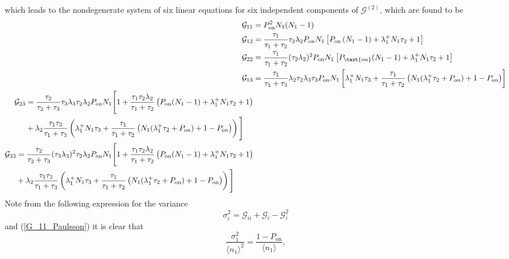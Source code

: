\documentclass[a4paper, 11pt]{article}
\begin{document}
which leads to the nondegenerate system of six linear equations for six independent components of $\boldsymbol{\mathcal G}^{(2)}$, which are found to be
\begin{align}
      {\mathcal G}_{11}& = P_{\text{on}}^2N_1(N_1-1) \label{G_11_Paulsson}\\
      {\mathcal G}_{12}& = \frac{\tau_1}{\tau_1+\tau_2}\tau_2\lambda_2P_{\text{on}}N_1\left[P_{\text{on}}\left(N_1-1\right)+\lambda_1^+N_1\tau_2+1\right]\\
      {\mathcal G}_{22}& = \frac{\tau_1}{\tau_1+\tau_2}(\tau_2\lambda_2)^2P_{\text{on}}N_1\left[P_{\taxt{on}}(N_1-1)+\lambda_1^+N_1\tau_2+1\right] \label{G_22_Paulsson} \\
      {\mathcal G}_{13}& = \frac{\tau_1}{\tau_1+\tau_3}\lambda_2\tau_2\lambda_3\tau_3P_{\text{on}}N_1\left[\lambda_1^+N_1\tau_3 + \frac{\tau_1}{\tau_1+\tau_2}\left(N_1(\lambda_1^+\tau_2+P_{\text{on}})+1-P_{\text{on}}\right)\right]\\
      \begin{split}
        {\mathcal G}_{23}& = \frac{\tau_2}{\tau_2+\tau_3}\tau_3\lambda_3\tau_2\lambda_2P_{\text{on}}N_1\Bigg[1 + \frac{\tau_1\tau_2\lambda_2}{\tau_1+\tau_2}\left(P_{\text{on}}(N_1-1)+\lambda_1^+N_1\tau_2+1\right)\\& + \lambda_2\frac{\tau_1\tau_3}{\tau_1+\tau_3}\left(\lambda_1^+N_1\tau_3 + \frac{\tau_1}{\tau_1+\tau_2}\left(N_1(\lambda_1^+\tau_2+P_{\text{on}})+1-P_{\text{on}}\right)\right)\Bigg]
      \end{split}\\
      \begin{split}
        {\mathcal G}_{33}& = \frac{\tau_2}{\tau_2+\tau_3}(\tau_3\lambda_3)^2\tau_2\lambda_2P_{\text{on}}N_1\Bigg[1 + \frac{\tau_1\tau_2\lambda_2}{\tau_1+\tau_2}\left(P_{\text{on}}(N_1-1)+\lambda_1^+N_1\tau_2+1\right)\\& + \lambda_2\frac{\tau_1\tau_3}{\tau_1+\tau_3}\left(\lambda_1^+N_1\tau_3 + \frac{\tau_1}{\tau_1+\tau_2}\left(N_1(\lambda_1^+\tau_2+P_{\text{on}})+1-P_{\text{on}}\right)\right)\Bigg] \label{G_33_Paulsson}
      \end{split}
\end{align}
Note from the following expression for the variance
\begin{equation}\label{sigma2_from_G}
  \sigma_i^2 = {\mathcal G}_{ii} + {\mathcal G}_i - {\mathcal G}_i^2
\end{equation}
and (\ref{G_11_Paulsson}) it is clear that
\begin{equation*}
  \frac{\sigma_1^2}{\langle n_1\rangle^2} = \frac{1-P_{\text{on}}}{\langle n_1\rangle},
\end{equation*}
\end{document}
